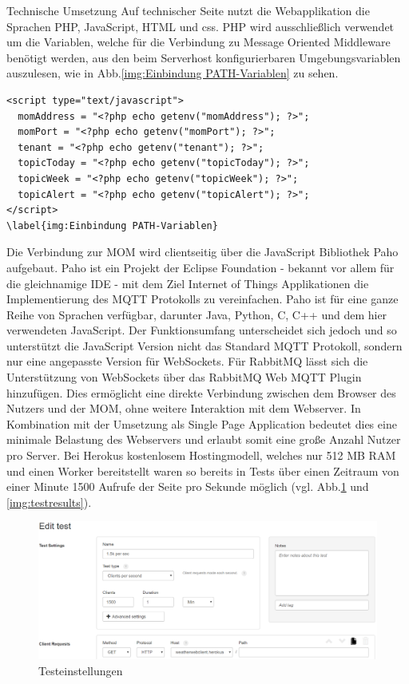 Technische Umsetzung
Auf technischer Seite nutzt die Webapplikation die Sprachen PHP, JavaScript, HTML und css. PHP wird ausschließlich verwendet um die Variablen, welche für die Verbindung zu Message Oriented Middleware benötigt werden, aus den beim Serverhost konfigurierbaren Umgebungsvariablen auszulesen, wie in Abb.\ref{img:Einbindung PATH-Variablen} zu sehen.
\begin{lstlisting} 
<script type="text/javascript">
  momAddress = "<?php echo getenv("momAddress"); ?>";
  momPort = "<?php echo getenv("momPort"); ?>";
  tenant = "<?php echo getenv("tenant"); ?>";
  topicToday = "<?php echo getenv("topicToday"); ?>";
  topicWeek = "<?php echo getenv("topicWeek"); ?>";
  topicAlert = "<?php echo getenv("topicAlert"); ?>";
</script>
\label{img:Einbindung PATH-Variablen}
\end{lstlisting}
Die Verbindung zur MOM wird clientseitig über die JavaScript Bibliothek Paho aufgebaut. Paho ist ein Projekt der Eclipse Foundation - bekannt vor allem für die gleichnamige IDE - mit dem Ziel Internet of Things Applikationen die Implementierung des MQTT Protokolls zu vereinfachen. Paho ist für eine ganze Reihe von Sprachen verfügbar, darunter Java, Python, C, C++ und dem hier verwendeten JavaScript. Der Funktionsumfang unterscheidet sich jedoch und so unterstützt die JavaScript Version nicht das Standard MQTT Protokoll, sondern nur eine angepasste Version für WebSockets. Für RabbitMQ lässt sich die Unterstützung von WebSockets über das RabbitMQ Web MQTT Plugin hinzufügen. Dies ermöglicht eine direkte Verbindung zwischen dem Browser des Nutzers und der MOM, ohne weitere Interaktion mit dem Webserver.
In Kombination mit der Umsetzung als Single Page Application bedeutet dies eine minimale Belastung des Webservers und erlaubt somit eine große Anzahl Nutzer pro Server. Bei Herokus kostenlosem Hostingmodell, welches nur 512 MB RAM und einen Worker bereitstellt waren so bereits in Tests über einen Zeitraum von einer Minute 1500 Aufrufe der Seite pro Sekunde möglich (vgl. Abb.\ref{img:testsettings} und \ref{img:testresults}).
\begin{figure}[htbp]
	\centering
	\includegraphics[width=1.0\textwidth]{Bilder/Web-TestSettings.png}
	\caption{Testeinstellungen}
	\label{img:testsettings}
\end{figure}

